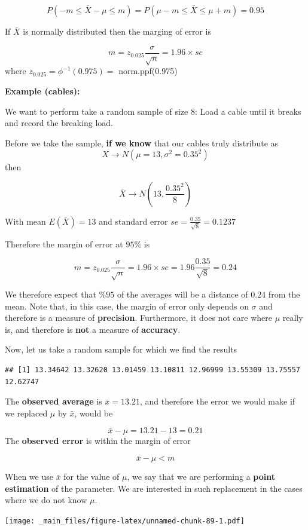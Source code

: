 \documentclass[
]{book}
\begin{document}
\[P(-m \leq \bar{X}-\mu \leq m)=P(\mu-m \leq \bar{X} \leq\mu + m)=0.95\]

If \(\bar{X}\) is normally distributed then the marging of error is

\[m=z_{0.025} \frac{\sigma}{\sqrt{n}}=1.96\times se\]
where \(z_{0.025}=\phi^{-1}(0.975)=\) norm.ppf(0.975)

\textbf{Example (cables):}

We want to perform take a random sample of size \(8\): Load a cable until it breaks and record the breaking load.

Before we take the sample, \textbf{if we know} that our cables truly distribute as \[X \rightarrow N(\mu=13, \sigma^2=0.35^2)\] then

\[\bar{X} \rightarrow N(13, \frac{0.35^2}{8})\]

With mean \(E(\bar{X})=13\) and standard error \(se=\frac{0.35}{\sqrt{8}}=0.1237\)

Therefore the margin of error at \(95\%\) is

\[m=z_{0.025} \frac{\sigma}{\sqrt{n}}=1.96\times se=1.96\frac{0.35}{\sqrt{8}}=0.24\]

We therefore expect that \(\%95\) of the averages will be a distance of \(0.24\) from the mean. Note that, in this case, the margin of error only depends on \(\sigma\) and therefore is a measure of \textbf{precision}. Furthermore, it does not care where \(\mu\) really is, and therefore is \textbf{not} a measure of \textbf{accuracy}.

Now, let us take a random sample for which we find the results

\begin{verbatim}
## [1] 13.34642 13.32620 13.01459 13.10811 12.96999 13.55309 13.75557 12.62747
\end{verbatim}

The \textbf{observed average} is \(\bar{x}=13.21\), and therefore the error we would make if we replaced \(\mu\) by \(\bar{x}\), would be

\[\bar{x}-\mu=13.21-13=0.21\]
The \textbf{observed error} is within the margin of error

\[\bar{x}-\mu <m\]

When we use \(\bar{x}\) for the value of \(\mu\), we say that we are performing a \textbf{point estimation} of the parameter. We are interested in such replacement in the cases where we do not know \(\mu\).

\texttt{[image: \_main\_files/figure-latex/unnamed-chunk-89-1.pdf]}
\end{document}
